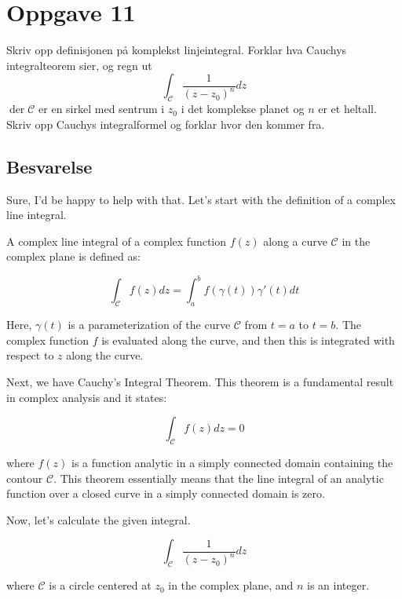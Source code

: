 \section{Oppgave 11}
Skriv opp definisjonen på komplekst linjeintegral. Forklar hva Cauchys integralteorem sier, og regn ut
\begin{equation*}
    \int_{\mathcal{C}} \frac{1}{\left(z-z_{0}\right)^{n}} d z
\end{equation*}
$ \operatorname{der} \mathcal{C} $ er en sirkel med sentrum i $ z_{0} $ i det komplekse planet og $ n $ er et heltall. Skriv opp Cauchys integralformel og forklar hvor den kommer fra.

\subsection*{Besvarelse}
Sure, I'd be happy to help with that. Let's start with the definition of a complex line integral.

A complex line integral of a complex function $f(z)$ along a curve $\mathcal{C}$ in the complex plane is defined as:

\begin{equation*}
\int_{\mathcal{C}} f(z) dz = \int_a^b f(\gamma(t)) \gamma'(t) dt
\end{equation*}

Here, $\gamma(t)$ is a parameterization of the curve $\mathcal{C}$ from $t=a$ to $t=b$. The complex function $f$ is evaluated along the curve, and then this is integrated with respect to $z$ along the curve.

Next, we have Cauchy's Integral Theorem. This theorem is a fundamental result in complex analysis and it states:

\begin{equation*}
\int_{\mathcal{C}} f(z) dz = 0
\end{equation*}

where $f(z)$ is a function analytic in a simply connected domain containing the contour $\mathcal{C}$. This theorem essentially means that the line integral of an analytic function over a closed curve in a simply connected domain is zero.

Now, let's calculate the given integral.

\begin{equation*}
\int_{\mathcal{C}} \frac{1}{(z-z_{0})^{n}} dz
\end{equation*}

where $\mathcal{C}$ is a circle centered at $z_{0}$ in the complex plane, and $n$ is an integer.

